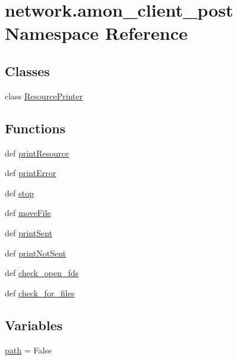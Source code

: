 \hypertarget{namespacenetwork_1_1amon__client__post}{\section{network.\-amon\-\_\-client\-\_\-post Namespace Reference}
\label{namespacenetwork_1_1amon__client__post}
}
\subsection*{Classes}
\begin{DoxyCompactItemize}
\item 
class \hyperlink{classnetwork_1_1amon__client__post_1_1_resource_printer}{Resource\-Printer}
\end{DoxyCompactItemize}
\subsection*{Functions}
\begin{DoxyCompactItemize}
\item 
def \hyperlink{namespacenetwork_1_1amon__client__post_ac7fae24e75eddc1c77f886bb66070c4b}{print\-Resource}
\item 
def \hyperlink{namespacenetwork_1_1amon__client__post_a815d9994ad428c47238dfcb18af0f701}{print\-Error}
\item 
def \hyperlink{namespacenetwork_1_1amon__client__post_a4b145fd299df4edf7e0a1f078ffaec79}{stop}
\item 
def \hyperlink{namespacenetwork_1_1amon__client__post_a8c12882b31becce7014946c8cf609305}{move\-File}
\item 
def \hyperlink{namespacenetwork_1_1amon__client__post_a6d8f576a2d0a6e9227aff2a3b4794b9c}{print\-Sent}
\item 
def \hyperlink{namespacenetwork_1_1amon__client__post_a5da81ffd1550088f89df928d5055e421}{print\-Not\-Sent}
\item 
def \hyperlink{namespacenetwork_1_1amon__client__post_acd190ee4294c2fdd8ca9cc72e1e58dcc}{check\-\_\-open\-\_\-fds}
\item 
def \hyperlink{namespacenetwork_1_1amon__client__post_a2ac73d2f564ef76105d4240755c25cdc}{check\-\_\-for\-\_\-files}
\end{DoxyCompactItemize}
\subsection*{Variables}
\begin{DoxyCompactItemize}
\item 
\hyperlink{namespacenetwork_1_1amon__client__post_acfdbc0b970e6eab6282f615a7355b09c}{path} = False
\end{DoxyCompactItemize}


